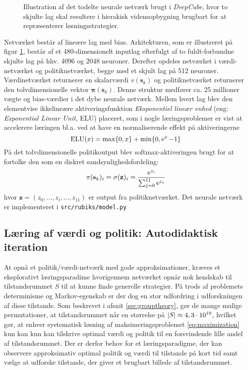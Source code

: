 \documentclass[../main.tex]{subfiles}
\begin{document}
\begin{figure}[H]
	\centering

\caption{Illustration af det todelte neurale netværk brugt i \textit{DeepCube}, hvor to skjulte lag skal resultere i hierakisk vidensopbygning brugbart for at repræsenterer løsningsstrategier.}
\label{fig:DNN}
\end{figure}
\noindent Netværket består af lineære lag med bias.  Arkitekturen, som er illustreret på figur \ref{fig:DNN}, består af et 480-dimensionelt inputlag efterfulgt af to fuldt-forbundne skjulte lag på hhv. 4096 og 2048 neuroner. Derefter opdeles netværket i værdi-netværket og politiknetværket, begge med et skjult lag på 512 neuroner. Værdinetværket returnerer en skalarværdi \(v(\mathbf s_k)\) og politiknetværket returnerer den tolvdimensionelle vektor \(\bm \pi (\mathbf s_k)\). Denne struktur medfører ca. 25 millioner vægte og bias-værdier i det dybe neurale netværk. Mellem hvert lag blev den elementvise ikkelineære aktiveringsfunktion \textit{Eksponentiel lineær enhed} (eng: \textit{Exponential Linear Unit}, ELU) placeret, som i nogle læringsproblemer er vist at accelerere læringen bl.a. ved at have en normaliserende effekt på aktiveringerne \cite{ELU} 
\[
\operatorname{ELU}(x) = \operatorname*{max}\{0, x\} + \operatorname{min}\{0, \operatorname{e}^{x} -1\}
\]
På det tolvdimensionelle politikoutput blev softmax-aktiveringen brugt for at fortolke den som en diskret sandsynlighedsfordeling:
\[
\pi(\mathbf s_k)_i = \sigma(\mathbf z)_i = \frac{\operatorname{e}^{z_i}}{\sum_{j=0}^{11} \operatorname{e}^{z_j}}
\]
hvor \(\mathbf z=(z_0, ..., z_i, ..., z_{11})\) er output fra politiknetværket.
Det neurale netværk er implementeret i \texttt{src/rubiks/model.py}

\subsection*{Læring af værdi og politik: Autodidaktisk iteration}
At opnå et politik/værdi-netværk med gode approksimationer, kræves et eksplorativt læringsparadime hvorigennem netværket opnår nok kendskab til tilstandsrummet \(S\) til at kunne finde generelle strategier. 
På trods af problemets determinisme og Markov-egenskab er der dog en stor udfordring i udforskningen af disse tilstande.
Som beskrevet i afsnit \ref{sec:grouptheory}, gør de mange mulige permutationer, at tilstandsrummet når en størrelse på \(|S|\approx 4,3\cdot10^{19}\), hvilket gør, at enhver systematisk løsning af maksimeringsproblemet \ref{eq:maximization} kun kan kun kan tilskrive optimal værdi og politik til en forsvindende lille andel af tilstandsrummet.
Der er derfor behov for et læringsparadigme, der kan observere approksimativ optimal politik og værdi til tilstande på kort tid samt vælge at udforske tilstande, der giver et brugbart billede af tilstandsrummet.
\end{document}

